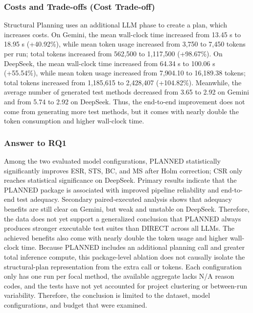 \documentclass[pdflatex,sn-basic,Numbered,iicol]{sn-jnl}
\begin{document}
\subsubsection{Costs and Trade-offs (Cost Trade-off)}\label{subsubsec:rq1-cost}

Structural Planning uses an additional LLM phase to create a plan, which increases costs. On Gemini, the mean wall-clock time increased from 13.45 s to 18.95 s (+40.92\%), while mean token usage increased from 3,750 to 7,450 tokens per run; total tokens increased from 562,500 to 1,117,500 (+98.67\%). On DeepSeek, the mean wall-clock time increased from 64.34 s to 100.06 s (+55.54\%), while mean token usage increased from 7,904.10 to 16,189.38 tokens; total tokens increased from 1,185,615 to 2,428,407 (+104.82\%). Meanwhile, the average number of generated test methods decreased from 3.65 to 2.92 on Gemini and from 5.74 to 2.92 on DeepSeek. Thus, the end-to-end improvement does not come from generating more test methods, but it comes with nearly double the token consumption and higher wall-clock time.

\subsubsection{Answer to RQ1}\label{subsubsec:rq1-answer}

Among the two evaluated model configurations, PLANNED statistically significantly improves ESR, STS, BC, and MS after Holm correction; CSR only reaches statistical significance on DeepSeek. Primary results indicate that the PLANNED package is associated with improved pipeline reliability and end-to-end test adequacy. Secondary paired-executed analysis shows that adequacy benefits are still clear on Gemini, but weak and unstable on DeepSeek. Therefore, the data does not yet support a generalized conclusion that PLANNED always produces stronger executable test suites than DIRECT across all LLMs. The achieved benefits also come with nearly double the token usage and higher wall-clock time. Because PLANNED includes an additional planning call and greater total inference compute, this package-level ablation does not causally isolate the structural-plan representation from the extra call or tokens. Each configuration only has one run per focal method, the available aggregate lacks N/A reason codes, and the tests have not yet accounted for project clustering or between-run variability. Therefore, the conclusion is limited to the dataset, model configurations, and budget that were examined.
\end{document}
